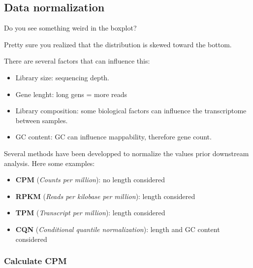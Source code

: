 \documentclass[]{book}
\begin{document}
\hypertarget{data-normalization}{%
\subsection{Data normalization}\label{data-normalization}}

Do you see something weird in the boxplot?

Pretty sure you realized that the distribution is skewed toward the bottom.

There are several factors that can influence this:

\begin{itemize}
\item
  Library size: sequencing depth.
\item
  Gene lenght: long gens = more reads
\item
  Library composition: some biological factors can influence the transcriptome between samples.
\item
  GC content: GC can influence mappability, therefore gene count.
\end{itemize}

Several methods have been developped to normalize the values prior downstream analysis.
Here some examples:

\begin{itemize}
\item
  \textbf{CPM} (\emph{Counts per million}): no length considered
\item
  \textbf{RPKM} (\emph{Reads per kilobase per million}): length considered
\item
  \textbf{TPM} (\emph{Transcript per million}): length considered
\item
  \textbf{CQN} (\emph{Conditional quantile normalization}): length and GC content considered
\end{itemize}

\hypertarget{calculate-cpm}{%
\subsubsection{Calculate CPM}\label{calculate-cpm}}
\end{document}

